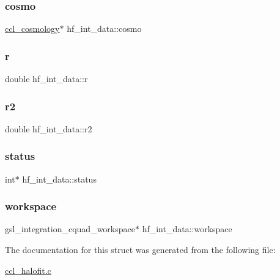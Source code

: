 \subsubsection{\texorpdfstring{cosmo}{cosmo}}
{\footnotesize\ttfamily \mbox{\hyperlink{structccl__cosmology}{ccl\+\_\+cosmology}}$\ast$ hf\+\_\+int\+\_\+data\+::cosmo}

\mbox{\label{structhf__int__data_afcabbea1ee0a5dd35a504625cc81ebc4}} 
\subsubsection{\texorpdfstring{r}{r}}
{\footnotesize\ttfamily double hf\+\_\+int\+\_\+data\+::r}

\mbox{\label{structhf__int__data_ae218cdbf681b9b00ded175d5a4a4bc0c}} 
\subsubsection{\texorpdfstring{r2}{r2}}
{\footnotesize\ttfamily double hf\+\_\+int\+\_\+data\+::r2}

\mbox{\label{structhf__int__data_a582dbcc1fc57ecff72089cdd20bb36e1}} 
\subsubsection{\texorpdfstring{status}{status}}
{\footnotesize\ttfamily int$\ast$ hf\+\_\+int\+\_\+data\+::status}

\mbox{\label{structhf__int__data_a2fe95aa9a0b421a9b06b63d2cef6b446}} 
\subsubsection{\texorpdfstring{workspace}{workspace}}
{\footnotesize\ttfamily gsl\+\_\+integration\+\_\+cquad\+\_\+workspace$\ast$ hf\+\_\+int\+\_\+data\+::workspace}



The documentation for this struct was generated from the following file\+:\begin{DoxyCompactItemize}
\item 
\mbox{\hyperlink{ccl__halofit_8c}{ccl\+\_\+halofit.\+c}}\end{DoxyCompactItemize}
